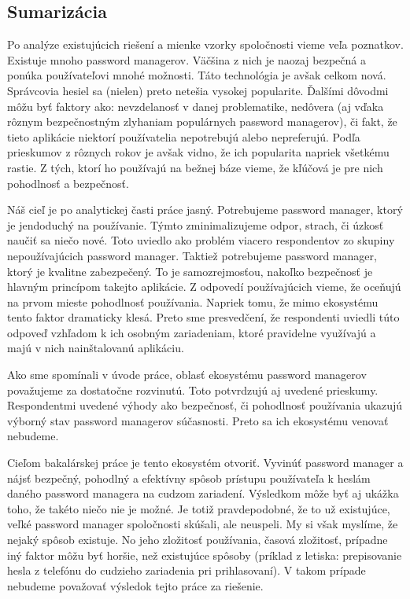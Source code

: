 \subsection{Sumarizácia}
Po analýze existujúcich riešení a mienke vzorky spoločnosti vieme veľa poznatkov. Existuje mnoho password managerov. Väčšina z nich je naozaj bezpečná a ponúka používateľovi mnohé možnosti. Táto technológia je avšak celkom nová. Správcovia hesiel sa (nielen) preto netešia vysokej popularite. Ďalšími dôvodmi môžu byť faktory ako: nevzdelanosť v danej problematike, nedôvera (aj vďaka rôznym bezpečnostným zlyhaniam populárnych password managerov), či fakt, že tieto aplikácie niektorí používatelia nepotrebujú alebo nepreferujú. Podľa prieskumov z rôznych rokov je avšak vidno, že ich popularita napriek všetkému rastie. Z tých, ktorí ho používajú na bežnej báze vieme, že kľúčová je pre nich pohodlnosť a bezpečnosť. 

Náš cieľ je po analytickej časti práce jasný. Potrebujeme password manager, ktorý je jendoduchý na používanie. Týmto zminimalizujeme odpor, strach, či úzkosť naučiť sa niečo nové. Toto uviedlo ako problém viacero respondentov zo skupiny nepoužívajúcich password manager. Taktiež potrebujeme password manager, ktorý je kvalitne zabezpečený. To je samozrejmosťou, nakoľko bezpečnosť je hlavným princípom takejto aplikácie. Z odpovedí používajúcich vieme, že oceňujú na prvom mieste pohodlnosť používania. Napriek tomu, že mimo ekosystému tento faktor dramaticky klesá. Preto sme presvedčení, že respondenti uviedli túto odpoveď vzhľadom k ich osobným zariadeniam, ktoré pravidelne využívajú a majú v nich nainštalovanú aplikáciu.

Ako sme spomínali v úvode práce, oblasť ekosystému password managerov považujeme za dostatočne rozvinutú. Toto potvrdzujú aj uvedené prieskumy. Respondentmi uvedené výhody ako bezpečnosť, či pohodlnosť používania ukazujú výborný stav password managerov súčasnosti. Preto sa ich ekosystému venovať nebudeme. 

Cieľom bakalárskej práce je tento ekosystém otvoriť. Vyvinúť password manager a nájsť bezpečný, pohodlný a efektívny spôsob prístupu používateľa k heslám daného password managera na cudzom zariadení. Výsledkom môže byť aj ukážka toho, že takéto niečo nie je možné. Je totiž pravdepodobné, že to už existujúce, veľké password manager spoločnosti skúšali, ale neuspeli. My si však myslíme, že nejaký spôsob existuje. No jeho zložitosť používania, časová zložitosť, prípadne iný faktor môžu byť horšie, než existujúce spôsoby (príklad z letiska: prepisovanie hesla z telefónu do cudzieho zariadenia pri prihlasovaní). V takom prípade nebudeme považovať výsledok tejto práce za riešenie.